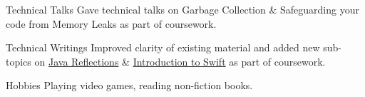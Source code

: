 


\begin{cvskills}


  \cvskill
  {Technical Talks}
  {Gave technical talks on Garbage Collection \& Safeguarding your code from Memory Leaks as part of coursework.}


  \cvskill
  {Technical Writings}
  {Improved clarity of existing material and added new sub-topics on \href{https://github.com/se-edu/learningresources/pull/30}{Java Reflections} \& \href{https://github.com/se-edu/learningresources/pull/31}{Introduction to Swift} \linebreak as part of coursework.}


  \cvskill
  {Hobbies}
  {Playing video games, reading non-fiction books.}


\end{cvskills}